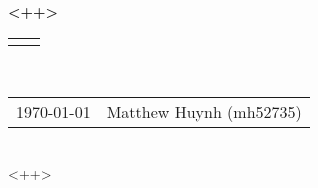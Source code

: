 \documentclass{article}
\renewcommand{\title}[1]{\textbf{#1}\\}
\renewcommand{\line}{\begin{tabularx}{\textwidth}{X>{\raggedleft}X}\hline\\\end{tabularx}\\[-0.25cm]}
\newcommand{\leftright}[2]{\begin{tabularx}{\textwidth}{X>{\raggedleft}X}#1%
& #2\\\end{tabularx}\\[-0.25cm]}
\theoremstyle{definition}
\theoremstyle{remark}
\newcommand{\?}{\stackrel{?}{=}}
\begin{document}
\title{<++>}
\line
\leftright{\today}{Matthew Huynh (mh52735)} %

<++>
\end{document}
